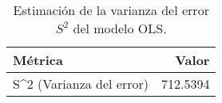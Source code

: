 \begin{table}
\caption{Estimación de la varianza del error $S^2$ del modelo OLS.}
\label{tab:varianza_error}
\begin{tabular}{lr}
\toprule
Métrica & Valor \\
\midrule
S^2 (Varianza del error) & 712.5394 \\
\bottomrule
\end{tabular}
\end{table}

